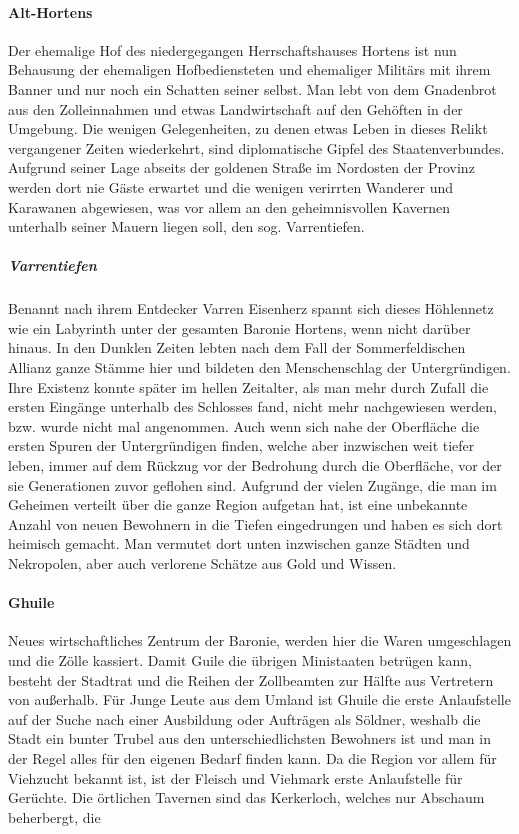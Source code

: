 \documentclass[a4paper,12pt,oneside]{book}
\begin{document}
\paragraph{Alt-Hortens}
Der ehemalige Hof des niedergegangen Herrschaftshauses Hortens ist nun Behausung der ehemaligen Hofbediensteten und ehemaliger Militärs mit ihrem Banner und nur noch ein Schatten seiner selbst. Man lebt von dem Gnadenbrot aus den Zolleinnahmen und etwas Landwirtschaft auf den Gehöften in der Umgebung. Die wenigen Gelegenheiten, zu denen etwas Leben in dieses Relikt vergangener Zeiten wiederkehrt, sind diplomatische Gipfel des Staatenverbundes. Aufgrund seiner Lage abseits der goldenen Straße im Nordosten der Provinz werden dort nie Gäste erwartet und die wenigen verirrten Wanderer und Karawanen abgewiesen, was vor allem an den geheimnisvollen Kavernen unterhalb seiner Mauern liegen soll, den sog. Varrentiefen.
\subparagraph{Varrentiefen}
Benannt nach ihrem Entdecker Varren Eisenherz spannt sich dieses Höhlennetz wie ein Labyrinth unter der gesamten Baronie Hortens, wenn nicht darüber hinaus. In den Dunklen Zeiten lebten nach dem Fall der Sommerfeldischen Allianz ganze Stämme hier und bildeten den Menschenschlag der Untergründigen. Ihre Existenz konnte später im hellen Zeitalter, als man mehr durch Zufall die ersten Eingänge unterhalb des Schlosses fand, nicht mehr nachgewiesen werden, bzw. wurde nicht mal angenommen. Auch wenn sich nahe der Oberfläche die ersten Spuren der Untergründigen finden, welche aber inzwischen weit tiefer leben, immer auf dem Rückzug vor der Bedrohung durch die Oberfläche, vor der sie Generationen zuvor geflohen sind. Aufgrund der vielen Zugänge, die man im Geheimen verteilt über die ganze Region aufgetan hat, ist eine unbekannte Anzahl von neuen Bewohnern in die Tiefen eingedrungen und haben es sich dort heimisch gemacht. Man vermutet dort unten inzwischen ganze Städten und Nekropolen, aber auch verlorene Schätze aus Gold und Wissen. 
\paragraph{Ghuile}
Neues wirtschaftliches Zentrum der Baronie, werden hier die Waren umgeschlagen und die Zölle kassiert. Damit Guile die übrigen Ministaaten betrügen kann, besteht der Stadtrat und die Reihen der Zollbeamten zur Hälfte aus Vertretern von außerhalb. Für Junge Leute aus dem Umland ist Ghuile die erste Anlaufstelle auf der Suche nach einer Ausbildung oder Aufträgen als Söldner, weshalb die Stadt ein bunter Trubel aus den unterschiedlichsten Bewohners ist und man in der Regel alles für den eigenen Bedarf finden kann. Da die Region vor allem für Viehzucht bekannt ist, ist der Fleisch und Viehmark erste Anlaufstelle für Gerüchte. Die örtlichen Tavernen sind das Kerkerloch, welches nur Abschaum beherbergt, die 
\end{document}
